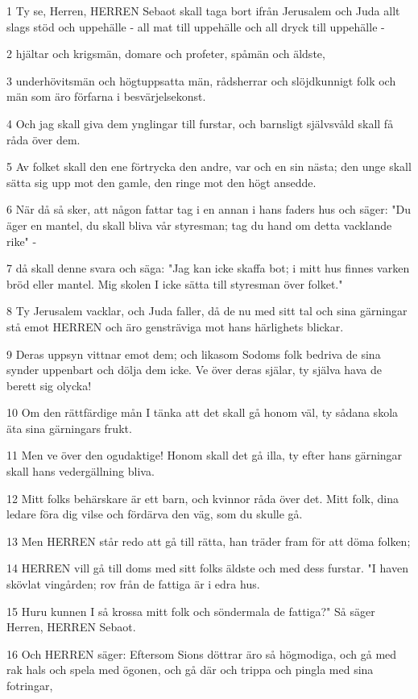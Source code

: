 \par 1 Ty se, Herren, HERREN Sebaot skall taga bort ifrån Jerusalem och Juda allt slags stöd och uppehälle - all mat till uppehälle och all dryck till uppehälle -
\par 2 hjältar och krigsmän, domare och profeter, spåmän och äldste,
\par 3 underhövitsmän och högtuppsatta män, rådsherrar och slöjdkunnigt folk och män som äro förfarna i besvärjelsekonst.
\par 4 Och jag skall giva dem ynglingar till furstar, och barnsligt självsvåld skall få råda över dem.
\par 5 Av folket skall den ene förtrycka den andre, var och en sin nästa; den unge skall sätta sig upp mot den gamle, den ringe mot den högt ansedde.
\par 6 När då så sker, att någon fattar tag i en annan i hans faders hus och säger: "Du äger en mantel, du skall bliva vår styresman; tag du hand om detta vacklande rike" -
\par 7 då skall denne svara och säga: "Jag kan icke skaffa bot; i mitt hus finnes varken bröd eller mantel. Mig skolen I icke sätta till styresman över folket."
\par 8 Ty Jerusalem vacklar, och Juda faller, då de nu med sitt tal och sina gärningar stå emot HERREN och äro gensträviga mot hans härlighets blickar.
\par 9 Deras uppsyn vittnar emot dem; och likasom Sodoms folk bedriva de sina synder uppenbart och dölja dem icke. Ve över deras själar, ty själva hava de berett sig olycka!
\par 10 Om den rättfärdige mån I tänka att det skall gå honom väl, ty sådana skola äta sina gärningars frukt.
\par 11 Men ve över den ogudaktige! Honom skall det gå illa, ty efter hans gärningar skall hans vedergällning bliva.
\par 12 Mitt folks behärskare är ett barn, och kvinnor råda över det. Mitt folk, dina ledare föra dig vilse och fördärva den väg, som du skulle gå.
\par 13 Men HERREN står redo att gå till rätta, han träder fram för att döma folken;
\par 14 HERREN vill gå till doms med sitt folks äldste och med dess furstar. "I haven skövlat vingården; rov från de fattiga är i edra hus.
\par 15 Huru kunnen I så krossa mitt folk och söndermala de fattiga?" Så säger Herren, HERREN Sebaot.
\par 16 Och HERREN säger: Eftersom Sions döttrar äro så högmodiga, och gå med rak hals och spela med ögonen, och gå där och trippa och pingla med sina fotringar,
